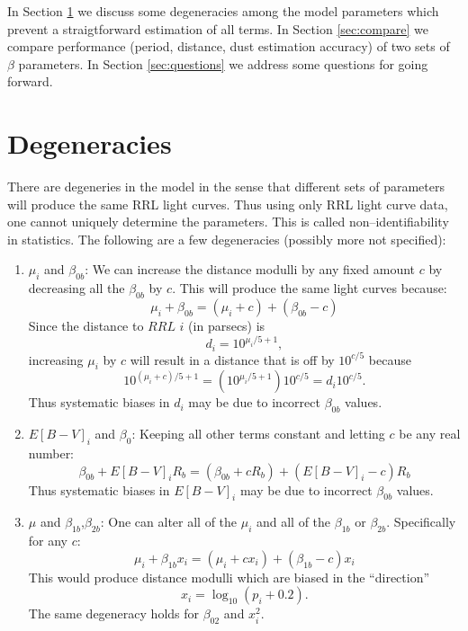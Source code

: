 \documentclass[12pt]{article}
\begin{document}
In Section \ref{sec:nonident} we discuss some degeneracies among the model parameters which prevent a straigtforward estimation of all terms. In Section \ref{sec:compare} we compare performance (period, distance, dust estimation accuracy) of two sets of $\beta$ parameters. In Section \ref{sec:questions} we address some questions for going forward.

\section{Degeneracies}
\label{sec:nonident}

There are degeneries in the model in the sense that different sets of parameters will produce the same RRL light curves. Thus using only RRL light curve data, one cannot uniquely determine the parameters. This is called non--identifiability in statistics. The following are a few degeneracies (possibly more not specified):
\begin{enumerate}
\item $\mu_i$ and $\beta_{0b}$: We can increase the distance modulli by any fixed amount $c$ by decreasing all the $\beta_{0b}$ by $c$. This will produce the same light curves because:
  \begin{equation*}
    \mu_i + \beta_{0b} = (\mu_i + c) + (\beta_{0b}-c)
  \end{equation*}
  Since the distance to $RRL$ $i$ (in parsecs) is
  \begin{equation*}
    d_i = 10^{\mu_i/5 + 1},
  \end{equation*}
  increasing $\mu_i$ by $c$ will result in a distance that is off by $10^{c/5}$ because
  \begin{equation*}
   10^{(\mu_i + c)/5 + 1} = (10^{\mu_i/5 + 1})10^{c/5} = d_i10^{c/5}.
  \end{equation*}
  Thus systematic biases in $d_i$ may be due to incorrect $\beta_{0b}$ values.
\item $E[B-V]_i$ and $\beta_{0}$: Keeping all other terms constant and letting $c$ be any real number:
  \begin{equation*}
    \beta_{0b} + E[B-V]_iR_b = (\beta_{0b} + cR_b) + (E[B-V]_i-c)R_b
  \end{equation*}
  Thus systematic biases in $E[B-V]_i$ may be due to incorrect $\beta_{0b}$ values.
\item $\mu$ and $\beta_{1b}$,$\beta_{2b}$: One can alter all of the $\mu_i$ and all of the $\beta_{1b}$ or $\beta_{2b}$. Specifically for any $c$:
  \begin{equation*}
    \mu_i + \beta_{1b}x_i = (\mu_i + cx_i) + (\beta_{1b}-c)x_i
  \end{equation*}
  This would produce distance modulli which are biased in the ``direction''
  \begin{equation*}
    x_i=\log_{10}(p_i+0.2).
  \end{equation*}
  The same degeneracy holds for $\beta_{02}$ and $x_i^2$.
\end{enumerate}
\end{document}
